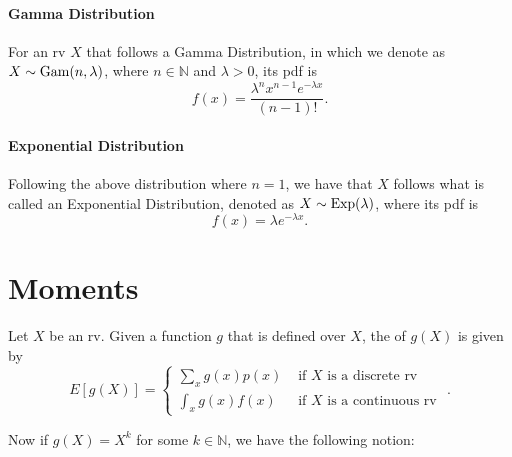 \documentclass[notoc,notitlepage]{tufte-book}
\begin{document}
\paragraph{Gamma Distribution} For an rv $X$ that
follows a Gamma Distribution, in which we denote as $X \sim \operatorname{Gam}(n, \lambda)$,
where $n \in \mathbb{N}$ and $\lambda > 0$, its pdf is
\begin{equation*}
  f(x) = \frac{\lambda^n x^{n - 1} e^{-\lambda x}}{( n - 1 )!}.
\end{equation*}

\paragraph{Exponential Distribution} Following
the above distribution where $n = 1$, we have that $X$ follows what is called an
Exponential Distribution, denoted as $X \sim \operatorname{Exp}(\lambda)$, where its pdf is
\begin{equation*}
  f(x) = \lambda e^{- \lambda x}.
\end{equation*}



\section{Moments}%
\label{sec:moments}

\begin{defn}[Expectation]
  \label{defn:expectation}
  Let $X$ be an rv. Given a function $g$ that is defined over $X$, the
   of $g(X)$ is given by
  \begin{equation*}
    E[ g(X) ] = \begin{cases}
      \sum_{x} g(x) p(x) & \text{ if } X \text{ is a discrete rv } \\
      \int_{x} g(x) f(x) & \text{ if } X \text{ is a continuous rv }
    \end{cases}.
  \end{equation*}
\end{defn}

Now if $g(X) = X^k$ for some $k \in \mathbb{N}$, we have the following notion:
\end{document}
